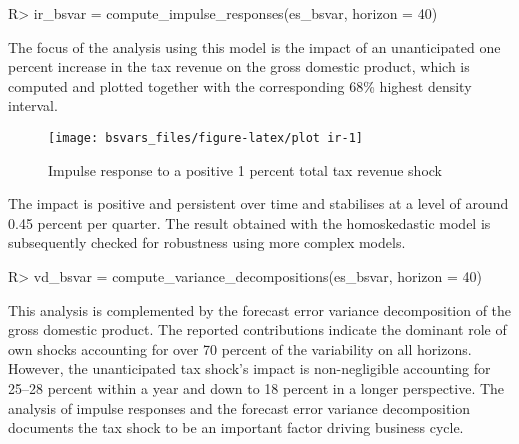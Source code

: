 \documentclass[
  nojss]{jss}
\begin{document}
\begin{CodeChunk}
\begin{CodeInput}
R> ir_bsvar  = compute_impulse_responses(es_bsvar, horizon = 40)
\end{CodeInput}
\end{CodeChunk}

The focus of the analysis using this model is the impact of an
unanticipated one percent increase in the tax revenue on the gross
domestic product, which is computed and plotted together with the
corresponding 68\% highest density interval.

\begin{CodeChunk}
\begin{figure}

{\centering \texttt{[image: bsvars\_files/figure-latex/plot ir-1]} 

}

\caption[Impulse response to a positive 1 percent total tax revenue shock]{Impulse response to a positive 1 percent total tax revenue shock}\label{fig:plot ir}
\end{figure}
\end{CodeChunk}

The impact is positive and persistent over time and stabilises at a
level of around 0.45 percent per quarter. The result obtained with the
homoskedastic model is subsequently checked for robustness using more
complex models.

\begin{CodeChunk}
\begin{CodeInput}
R> vd_bsvar  = compute_variance_decompositions(es_bsvar, horizon = 40)
\end{CodeInput}
\end{CodeChunk}

This analysis is complemented by the forecast error variance
decomposition of the gross domestic product. The reported contributions
indicate the dominant role of own shocks accounting for over 70 percent
of the variability on all horizons. However, the unanticipated tax
shock's impact is non-negligible accounting for 25--28 percent within a
year and down to 18 percent in a longer perspective. The analysis of
impulse responses and the forecast error variance decomposition
documents the tax shock to be an important factor driving business
cycle.
\end{document}
